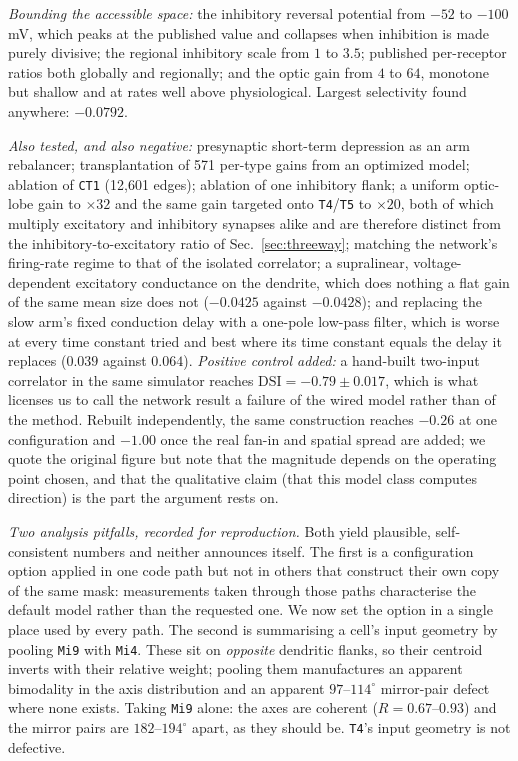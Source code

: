 \documentclass[10pt,twoside]{article}
\newcommand{\cell}[1]{\texttt{#1}}
\begin{document}
\emph{Bounding the accessible space:} the inhibitory reversal potential from
$-52$ to $-100$\,mV, which peaks at the published value and collapses when
inhibition is made purely divisive; the regional inhibitory scale from $1$ to
$3.5$; published per-receptor ratios both globally and regionally; and the
optic gain from $4$ to $64$, monotone but shallow and at rates well above
physiological. Largest selectivity found anywhere: $-0.0792$.

\emph{Also tested, and also negative:} presynaptic short-term
depression as an arm rebalancer; transplantation of 571 per-type gains from an
optimized model; ablation of \cell{CT1} (12{,}601 edges); ablation of one
inhibitory flank; a uniform optic-lobe gain to $\times32$ and the same gain
targeted onto \cell{T4}/\cell{T5} to $\times20$, both of which multiply
excitatory and inhibitory synapses alike and are therefore distinct from the
inhibitory-to-excitatory ratio of Sec.~\ref{sec:threeway}; matching the network's firing-rate
regime to that of the isolated correlator; a supralinear, voltage-dependent
excitatory conductance on the dendrite, which does nothing a flat gain of the
same mean size does not ($-0.0425$ against $-0.0428$); and replacing the slow
arm's fixed conduction delay with a one-pole low-pass filter, which is worse at
every time constant tried and best where its time constant equals the delay it
replaces ($0.039$ against $0.064$). \emph{Positive control added:} a
hand-built two-input correlator in the same simulator reaches
$\mathrm{DSI}=-0.79\pm0.017$, which is what licenses us to call the network
result a failure of the wired model rather than of the method. Rebuilt independently, the same construction reaches $-0.26$ at one
configuration and $-1.00$ once the real fan-in and spatial spread are added; we
quote the original figure but note that the magnitude depends on the operating
point chosen, and that the qualitative claim (that this model class computes direction) is
the part the argument rests on.

\emph{Two analysis pitfalls, recorded for reproduction.} Both yield plausible,
self-consistent numbers and neither announces itself. The first is a
configuration option applied in one code path but not in others that construct
their own copy of the same mask: measurements taken through those paths
characterise the default model rather than the requested one. We now set the
option in a single place used by every path. The second is summarising a cell's
input geometry by pooling \cell{Mi9} with \cell{Mi4}. These sit on
\emph{opposite} dendritic flanks, so their centroid inverts with their relative
weight; pooling them manufactures an apparent bimodality in the axis
distribution and an apparent $97$--$114^\circ$ mirror-pair defect where none
exists. Taking \cell{Mi9} alone: the axes are
coherent ($R=0.67$--$0.93$) and the mirror pairs are $182$--$194^\circ$ apart,
as they should be. \cell{T4}'s input geometry is not defective.
\end{document}
